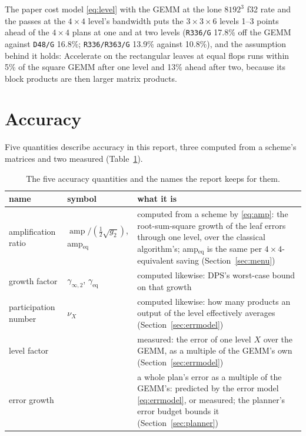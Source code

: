 \documentclass[11pt]{article}
\newcommand{\ginf}{\gamma_{\infty,2}}
\newcommand{\amp}{\operatorname{amp}}
\newcommand{\lv}[1]{\texttt{#1}}
\begin{document}
The paper cost model \eqref{eq:level} with the GEMM at the lone $8192^3$ f32
rate and the passes at the $4\times4$ level's bandwidth puts the
$3\times3\times6$ levels 1--3 points ahead of the $4\times4$ plans at one and
at two levels (\lv{R336/G} 17.8\% off the
GEMM against \lv{D48/G} 16.8\%; \lv{R336/R363/G} 13.9\% against 10.8\%), and
the assumption behind it holds: Accelerate on the rectangular leaves at equal
flops runs within 5\% of the square GEMM after one level and 13\% ahead after
two, because its block products are then larger matrix products.

\section{Accuracy}\label{sec:accuracy}

Five quantities describe accuracy in this report, three computed from a
scheme's matrices and two measured (Table~\ref{tab:accnames}).

\begin{table}[H]
\centering\footnotesize
\begin{tabular}{@{}l l p{}@{}}
\toprule
name & symbol & what it is\\
\midrule
amplification ratio & $\amp/(\tfrac12\sqrt{g_2})$, amp$_{\text{eq}}$ & computed from a scheme by
  \eqref{eq:amp}: the root-sum-square growth of the leaf errors through one
  level, over the classical algorithm's; amp$_{\text{eq}}$ is the same per
  $4\times4$-equivalent saving (Section~\ref{sec:menu})\\
growth factor & $\ginf$, $\gamma_{\text{eq}}$ & computed likewise: DPS's worst-case bound on that growth\\
participation number & $\nu_X$ & computed likewise: how many products an output of the level effectively averages (Section~\ref{sec:errmodel})\\
level factor & & measured: the error of one level $X$ over the GEMM, as a multiple of the GEMM's own (Section~\ref{sec:errmodel})\\
error growth & & a whole plan's error as a multiple of the GEMM's: predicted by the error model \eqref{eq:errmodel}, or
  measured; the planner's error budget bounds it (Section~\ref{sec:planner})\\
\bottomrule
\end{tabular}
\caption{The five accuracy quantities and the names the report keeps for them.}
\label{tab:accnames}
\end{table}
\end{document}
